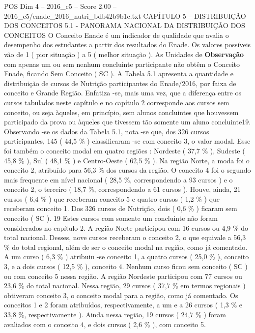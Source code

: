 \begin{textsample}{POS Dim 4 – 2016\_c5 – Score 2.00 – 2016\_c5/enade\_2016\_nutri\_bdb42b9b1c.txt}  \label{ex:f4_pos_107}
CAPÍTULO 5 – DISTRIBUIÇÃO DOS CONCEITOS 5.1 - PANORAMA NACIONAL DA DISTRIBUIÇÃO DOS CONCEITOS O Conceito Enade é um indicador de qualidade que avalia o desempenho dos estudantes a partir dos resultados do Enade.
Os valores possíveis vão de 1 ( pior situação ) a 5 ( melhor situação ).
As Unidades de \textbf{Observação} com apenas um ou sem nenhum concluinte participante não obtêm o Conceito Enade, ficando Sem Conceito ( SC ).
A Tabela 5.1 apresenta a quantidade e distribuição de cursos de Nutrição participantes do Enade/2016, por faixa de conceito e Grande Região.
Enfatiza -se, mais uma vez, que a diferença entre os cursos tabulados neste capítulo e no capítulo 2 corresponde aos cursos sem conceito, ou seja àqueles, em princípio, sem alunos concluintes que houvessem participado da prova ou àqueles que tivessem tão somente um aluno concluinte19.
Observando -se os dados da Tabela 5.1, nota -se que, dos 326 cursos participantes, 145 ( 44,5 \% ) classificaram -se com conceito 3, o valor modal.
Esse foi também o conceito modal em quatro regiões : Nordeste ( 37,7 \% ), Sudeste ( 45,8 \% ), Sul ( 48,1 \% ) e Centro-Oeste ( 62,5 \% ).
Na região Norte, a moda foi o conceito 2, atribuído para 56,3 \% dos cursos da região.
O conceito 4 foi o segundo mais frequente em nível nacional ( 28,5 \%, correspondendo a 93 cursos ) e o conceito 2, o terceiro ( 18,7 \%, correspondendo a 61 cursos ).
Houve, ainda, 21 cursos ( 6,4 \% ) que receberam conceito 5 e quatro cursos ( 1,2 \% ) que receberam conceito 1.
Dos 326 cursos de Nutrição, dois ( 0,6 \% ) ficaram sem conceito ( SC ). 19 Estes cursos com somente um concluinte não foram considerados no capítulo 2.
A região Norte participou com 16 cursos ou 4,9 \% do total nacional.
Desses, nove cursos receberam o conceito 2, o que equivale a 56,3 \% do total regional, além de ser o conceito modal na região, como já comentado.
A um curso ( 6,3 \% ) atribuiu -se conceito 1, a quatro cursos ( 25,0 \% ), conceito 3, e a dois cursos ( 12,5 \% ), conceito 4.
Nenhum curso ficou sem conceito ( SC ) ou com conceito 5 nessa região.
A região Nordeste participou com 77 cursos ou 23,6 \% do total nacional.
Nessa região, 29 cursos ( 37,7 \% em termos regionais ) obtiveram conceito 3, o conceito modal para a região, como já comentado.
Os conceitos 1 e 2 foram atribuídos, respectivamente, a um e a 26 cursos ( 1,3 \% e 33,8 \%, respectivamente ).
Ainda nessa região, 19 cursos ( 24,7 \% ) foram avaliados com o conceito 4, e dois cursos ( 2,6 \% ), com conceito 5.

\end{textsample}
